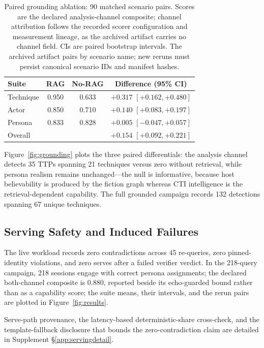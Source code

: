 \begin{table}[t]
\centering
\caption{Paired grounding ablation: 90 matched scenario pairs. Scores are
the declared analysis-channel composite; channel attribution follows the
recorded scorer configuration and measurement lineage, as the archived
artifact carries no channel field. CIs are paired bootstrap intervals.
The archived artifact pairs by scenario name; new reruns must persist canonical
scenario IDs and manifest hashes.}
\label{tab:b4}
\scriptsize
\setlength{\tabcolsep}{3.5pt}
\begin{tabular}{lccc}
\toprule
Suite & RAG & No-RAG & Difference (95\% CI) \\
\midrule
Technique & 0.950 & 0.633 & $+0.317$ $[+0.162,+0.480]$ \\
Actor & 0.850 & 0.710 & $+0.140$ $[+0.083,+0.197]$ \\
Persona & 0.833 & 0.828 & $+0.005$ $[-0.047,+0.057]$ \\
\midrule
Overall & & & $+0.154$ $[+0.092,+0.221]$ \\
\bottomrule
\end{tabular}
\end{table}



Figure~\ref{fig:grounding} plots the three paired differentials: the
analysis channel detects 35 TTPs spanning 21 techniques versus zero
without retrieval, while persona realism remains unchanged---the null is
informative, because host believability is produced by the fiction graph
whereas CTI intelligence is the retrieval-dependent capability. The full
grounded campaign records 132 detections spanning 67 unique techniques.

\subsection{Serving Safety and Induced Failures}
\label{sec:rq2}
The live workload records zero contradictions across 45 re-queries,
zero pinned-identity violations, and zero serves after a failed verifier
verdict. In the 218-query campaign, 218 sessions engage with correct
persona assignments; the declared both-channel composite is 0.880, reported beside its
echo-guarded bound rather than as a capability score; the suite means,
their intervals, and the rerun pairs are plotted in
Figure~\ref{fig:results}.

Serve-path provenance, the latency-based deterministic-share
cross-check, and the template-fallback disclosure that bounds the
zero-contradiction claim are detailed in Supplement
\S\ref{app:servingdetail}.

